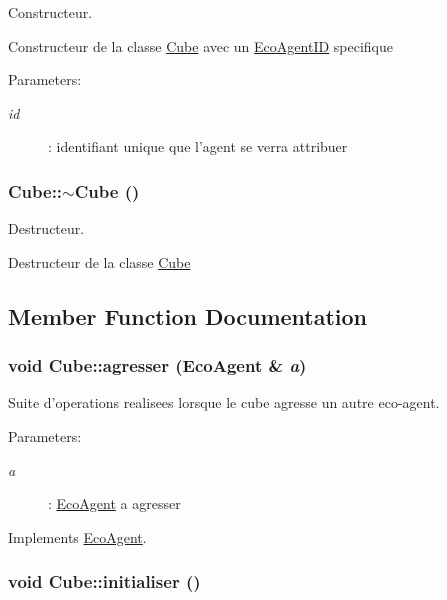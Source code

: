 Constructeur. 

Constructeur de la classe \hyperlink{classCube}{Cube} avec un \hyperlink{classEcoAgentID}{EcoAgentID} specifique

\begin{Desc}
\item[Parameters:]
\begin{description}
\item[{\em id}]: identifiant unique que l'agent se verra attribuer \end{description}
\end{Desc}
\hypertarget{classCube_a814e979cecb8c451fdb332ded2cea1e}{
\subsubsection[{$\sim$Cube}]{\setlength{\rightskip}{0pt plus 5cm}Cube::$\sim$Cube ()}}
\label{classCube_a814e979cecb8c451fdb332ded2cea1e}


Destructeur. 

Destructeur de la classe \hyperlink{classCube}{Cube} 

\subsection{Member Function Documentation}
\hypertarget{classCube_85556598281efcfa925dd4ef4c8acba5}{
\subsubsection[{agresser}]{\setlength{\rightskip}{0pt plus 5cm}void Cube::agresser ({\bf EcoAgent} \& {\em a})}}
\label{classCube_85556598281efcfa925dd4ef4c8acba5}


Suite d'operations realisees lorsque le cube agresse un autre eco-agent. 

\begin{Desc}
\item[Parameters:]
\begin{description}
\item[{\em a}]: \hyperlink{classEcoAgent}{EcoAgent} a agresser \end{description}
\end{Desc}


Implements \hyperlink{classEcoAgent_867f0c274eb3ed0b61cb1fe7baa67edd}{EcoAgent}.\hypertarget{classCube_6687c2575f4ce927f6b3032fb46040eb}{
\subsubsection[{initialiser}]{\setlength{\rightskip}{0pt plus 5cm}void Cube::initialiser ()}}
\label{classCube_6687c2575f4ce927f6b3032fb46040eb}



